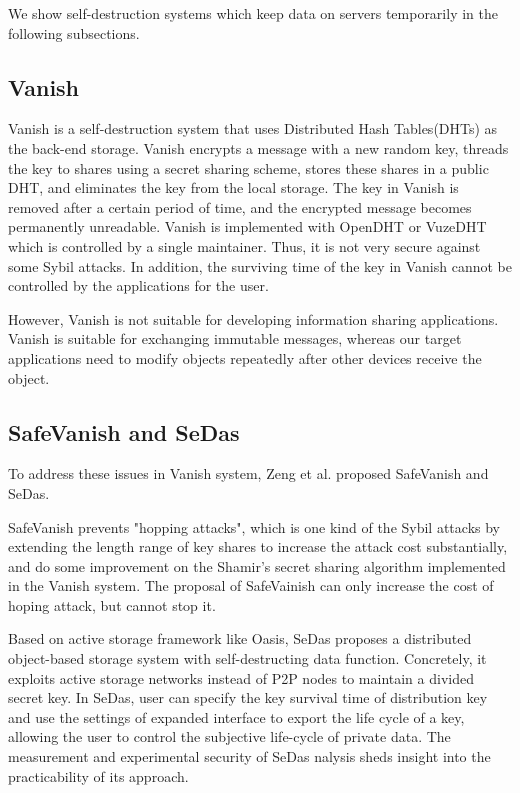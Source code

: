 \documentclass[a4paper,11pt]{report}
\begin{document}
We show self-destruction systems which keep data on servers temporarily in the following subsections.

\subsection{Vanish}

Vanish\cite{geambasu2009vanish} is a self-destruction system that uses Distributed Hash Tables(DHTs) as the back-end storage.
Vanish encrypts a message with a new random key, threads the key to shares using a secret sharing scheme, stores these shares in a public DHT, and eliminates the key from the local storage.
The key in Vanish is removed after a certain period of time, and the encrypted message becomes permanently unreadable.
Vanish is implemented with OpenDHT\cite{rhea2005opendht} or VuzeDHT\cite{vuzedht} which is controlled by a single maintainer. 
Thus, it is not very secure against some Sybil attacks\cite{cholez2009evaluation, wolchok2010defeating}. 
In addition, the surviving time of the key in Vanish cannot be controlled by the applications for the user.

However, Vanish is not suitable for developing information sharing applications. 
Vanish is suitable for exchanging immutable messages, whereas our target applications need to modify objects repeatedly after other devices receive the object.


\subsection{SafeVanish and SeDas}

To address these issues in Vanish system, Zeng et al. proposed SafeVanish\cite{zeng2010safevanish} and SeDas\cite{zeng2012sedas}. 

SafeVanish prevents "hopping attacks"\cite{wolchok2010defeating}, which is one kind of the Sybil attacks\cite{cholez2009evaluation, wolchok2010defeating} by extending the length range of key shares to increase the attack cost substantially, and do some improvement on the Shamir's secret sharing algorithm implemented in the Vanish system.
The proposal of SafeVainish can only increase the cost of hoping attack, but cannot stop it.

Based on active storage framework like Oasis\cite{xie2011design}, SeDas proposes a distributed object-based storage system with self-destructing data function.
Concretely, it exploits active storage networks instead of P2P nodes to maintain a divided secret key. 
In SeDas, user can specify the key survival time of distribution key and use the settings of expanded interface to export the life cycle of a key, allowing the user to control the subjective life-cycle of private data.
The measurement and experimental security of SeDas nalysis sheds insight into the practicability of its approach.
\end{document}
